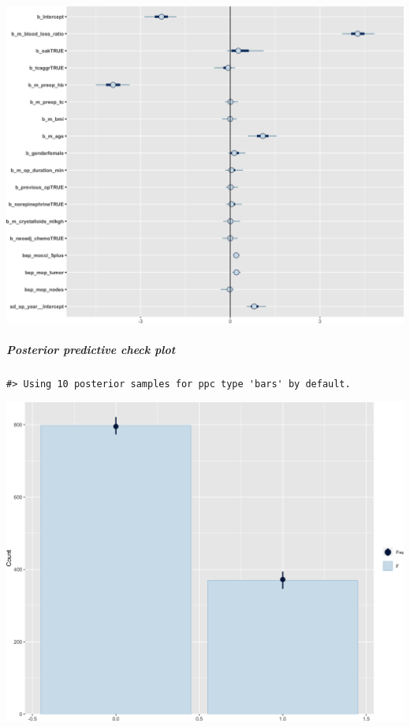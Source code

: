 \documentclass[
]{article}
\begin{document}
\begin{center}\includegraphics[width=1\linewidth]{notebook_files/figure-latex/model1full_diagnostics-2} \end{center}

\hypertarget{posterior-predictive-check-plot}{%
\subparagraph{Posterior predictive check plot}\label{posterior-predictive-check-plot}}

\begin{verbatim}
#> Using 10 posterior samples for ppc type 'bars' by default.
\end{verbatim}

\begin{center}\includegraphics[width=1\linewidth]{notebook_files/figure-latex/model1full_ppcheck-1} \end{center}
\end{document}

